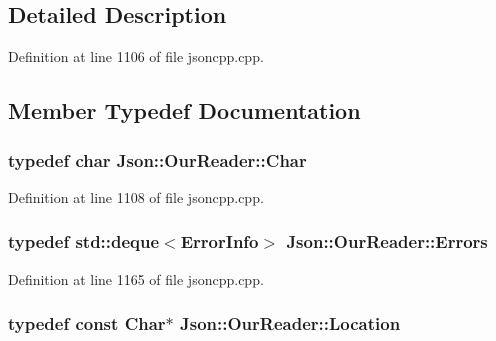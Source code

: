 \subsection{Detailed Description}


Definition at line 1106 of file jsoncpp.\+cpp.



\subsection{Member Typedef Documentation}
\subsubsection[{\texorpdfstring{Char}{Char}}]{\setlength{\rightskip}{0pt plus 5cm}typedef char {\bf Json\+::\+Our\+Reader\+::\+Char}}\hypertarget{class_json_1_1_our_reader_a0cd0bab4caa66594ab843ccd5f9dc239}{}\label{class_json_1_1_our_reader_a0cd0bab4caa66594ab843ccd5f9dc239}


Definition at line 1108 of file jsoncpp.\+cpp.

\subsubsection[{\texorpdfstring{Errors}{Errors}}]{\setlength{\rightskip}{0pt plus 5cm}typedef std\+::deque$<${\bf Error\+Info}$>$ {\bf Json\+::\+Our\+Reader\+::\+Errors}\hspace{0.3cm}{\ttfamily [private]}}\hypertarget{class_json_1_1_our_reader_a8cc69593ef7303e58e99bb5dbb767562}{}\label{class_json_1_1_our_reader_a8cc69593ef7303e58e99bb5dbb767562}


Definition at line 1165 of file jsoncpp.\+cpp.

\subsubsection[{\texorpdfstring{Location}{Location}}]{\setlength{\rightskip}{0pt plus 5cm}typedef const {\bf Char}$\ast$ {\bf Json\+::\+Our\+Reader\+::\+Location}}\hypertarget{class_json_1_1_our_reader_a1bdc7bbc52ba87cae6b19746f2ee0189}{}\label{class_json_1_1_our_reader_a1bdc7bbc52ba87cae6b19746f2ee0189}


